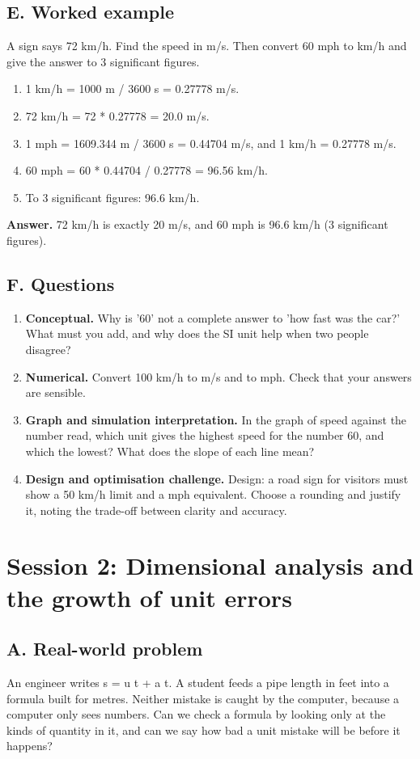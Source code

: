 \documentclass[11pt,a4paper]{article}
\begin{document}
\subsection*{E. Worked example}
A sign says 72 km/h. Find the speed in m/s. Then convert 60 mph to km/h and give the answer to 3 significant figures.
\begin{enumerate}[nosep]
\item 1 km/h = 1000 m / 3600 s = 0.27778 m/s.
\item 72 km/h = 72 * 0.27778 = 20.0 m/s.
\item 1 mph = 1609.344 m / 3600 s = 0.44704 m/s, and 1 km/h = 0.27778 m/s.
\item 60 mph = 60 * 0.44704 / 0.27778 = 96.56 km/h.
\item To 3 significant figures: 96.6 km/h.
\end{enumerate}
\textbf{Answer.} 72 km/h is exactly 20 m/s, and 60 mph is 96.6 km/h (3 significant figures).

\subsection*{F. Questions}
\begin{enumerate}[nosep]
\item \textbf{Conceptual.} Why is '60' not a complete answer to 'how fast was the car?' What must you add, and why does the SI unit help when two people disagree?
\item \textbf{Numerical.} Convert 100 km/h to m/s and to mph. Check that your answers are sensible.
\item \textbf{Graph and simulation interpretation.} In the graph of speed against the number read, which unit gives the highest speed for the number 60, and which the lowest? What does the slope of each line mean?
\item \textbf{Design and optimisation challenge.} Design: a road sign for visitors must show a 50 km/h limit and a mph equivalent. Choose a rounding and justify it, noting the trade-off between clarity and accuracy.
\end{enumerate}

\section{Session 2: Dimensional analysis and the growth of unit errors}

\subsection*{A. Real-world problem}
An engineer writes s = u t + a t. A student feeds a pipe length in feet into a formula built for metres. Neither mistake is caught by the computer, because a computer only sees numbers. Can we check a formula by looking only at the kinds of quantity in it, and can we say how bad a unit mistake will be before it happens?
\end{document}
